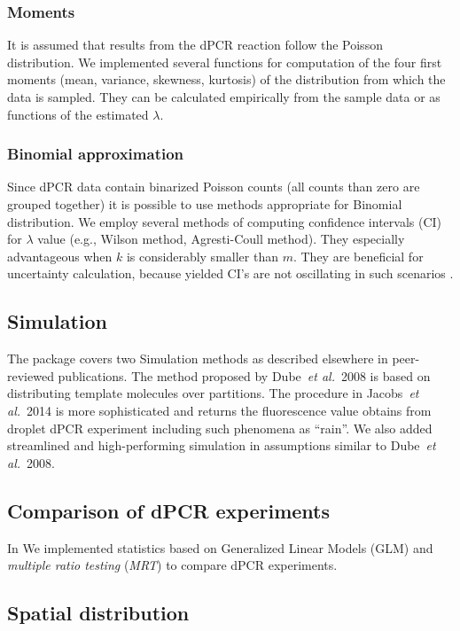 \documentclass[a4,center,fleqn]{NAR}
\begin{document}
\subsubsection{Moments}
It is assumed that results from the dPCR reaction follow the Poisson 
distribution. We implemented several functions for computation of the four 
first 
moments (mean, variance, skewness, kurtosis) of the distribution from which the 
data is sampled. They can be calculated empirically from the sample data or as 
functions of the estimated $\lambda$.

\subsubsection{Binomial approximation}
Since dPCR data contain binarized Poisson 
counts (all counts than zero are grouped together) it is possible to use 
methods 
appropriate for Binomial distribution. We employ several methods of computing 
confidence intervals (CI) for $\lambda$ value (e.g., Wilson method, 
Agresti-Coull method). They especially advantageous when $k$ is considerably 
smaller than $m$. They are beneficial for uncertainty calculation, because 
yielded CI's are not oscillating in such scenarios \cite{brown_2001}.

\subsection{Simulation}

The package covers two Simulation methods as described elsewhere in 
peer-reviewed publications. The method proposed by Dube~\textit{et al.}~2008 
\cite{dube_mathematical_2008} is based on distributing template molecules over 
partitions. The procedure in Jacobs~\textit{et al.}~2014 \cite{jacobs_2014} is 
more sophisticated and returns the fluorescence value obtains from droplet dPCR 
experiment including such phenomena as ``rain''. We also added streamlined and 
high-performing simulation in assumptions similar to Dube~\textit{et al.}~2008.

\subsection{Comparison of dPCR experiments}

In \cite{Burdukiewicz_tba} We implemented statistics based on Generalized 
Linear 
Models (GLM) and \textit{multiple ratio testing} (\textit{MRT}) to compare dPCR 
experiments. 

\subsection{Spatial distribution}
\end{document}

